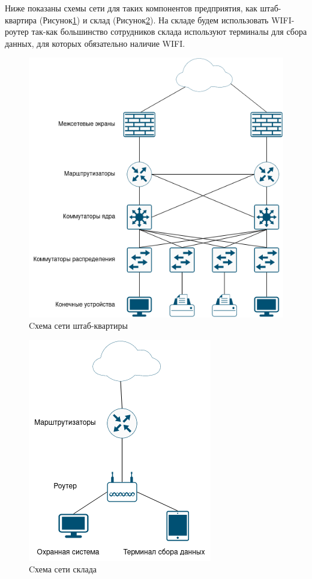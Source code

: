 \documentclass[14pt, a4paper]{extarticle}
\begin{document}
Ниже показаны схемы сети для таких компонентов предприятия, как штаб-квартира (Рисунок\;\ref{fig:comp_net}) и склад (Рисунок\;\ref{fig:sklad_net}). На складе будем использовать WIFI-роутер так-как большинство сотрудников склада используют терминалы для сбора данных, для которых обязательно наличие WIFI.  

\begin{figure}[H]
\includegraphics[scale=0.65]{comp_network.png}
\caption{Cхема сети штаб-квартиры\label{fig:comp_net}}
\end{figure}


\begin{figure}[H]
\centering
\includegraphics[scale=0.75]{sklad_net.png}
\caption{Cхема сети склада\label{fig:sklad_net}}
\end{figure}
\end{document}

